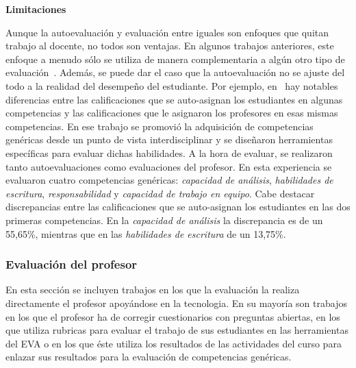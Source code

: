 \bigskip
\textbf{Limitaciones}
\bigskip

Aunque la autoevaluación y evaluación entre iguales son enfoques que quitan trabajo al docente, no todos son ventajas. En algunos trabajos anteriores, este enfoque a menudo sólo se utiliza de manera complementaria a algún otro tipo de evaluación~\cite{lasa2013problem,sevilla2012assessment}. Además, se puede dar el caso que la autoevaluación no se ajuste del todo a la realidad del desempeño del estudiante. Por ejemplo, en~\cite{carreras2013promotion} hay notables diferencias entre las calificaciones que se auto-asignan los estudiantes en algunas competencias y las calificaciones que le asignaron los profesores en esas mismas competencias. En ese trabajo se promovió la adquisición de competencias genéricas desde un punto de vista interdisciplinar y se diseñaron herramientas específicas para evaluar dichas habilidades. A la hora de evaluar, se realizaron tanto autoevaluaciones como evaluaciones del profesor. En esta experiencia se evaluaron cuatro competencias genéricas: \emph{capacidad de análisis},  \emph{habilidades de escritura}, \emph{responsabilidad} y \emph{capacidad de trabajo en equipo}. Cabe destacar discrepancias entre las calificaciones que se auto-asignan los estudiantes en las dos primeras competencias. En la \emph{capacidad de análisis} la discrepancia es de un 55,65\%, mientras que en las \emph{habilidades de escritura} de un 13,75\%.


\subsubsection{Evaluación del profesor}

En esta sección se incluyen trabajos en los que la evaluación la realiza directamente el profesor apoyándose en la tecnologia. En su mayoría son trabajos en los que el profesor ha de corregir cuestionarios con preguntas abiertas, en los que utiliza rubricas para evaluar el trabajo de sus estudiantes en las herramientas del EVA o en los que éste utiliza los resultados de las actividades del curso para enlazar sus resultados para la evaluación de competencias genéricas.


